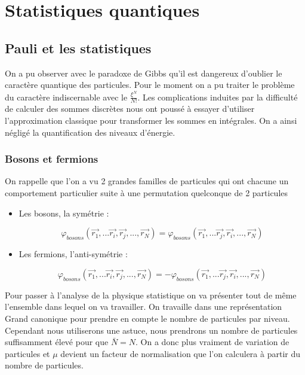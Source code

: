 \chapter{Statistiques quantiques}



\section{Pauli et les statistiques}


On a pu observer avec le paradoxe de Gibbs qu'il est dangereux d'oublier le caractère quantique des particules. Pour le moment on a pu traiter le problème du caractère indiscernable avec le $\frac{\xi^N}{N!}$. Les complications induites par la difficulté de calculer des sommes discrètes nous ont poussé à essayer d'utiliser l'approximation classique pour transformer les sommes en intégrales. On a ainsi négligé la quantification des niveaux d'énergie.

\subsection{Bosons et fermions}

On rappelle que l'on a vu 2 grandes familles de particules qui ont chacune un comportement particulier suite à une permutation quelconque de 2 particules

\begin{itemize}[label=]

	\item Les bosons, la symétrie : 

	$$\varphi_{bosons}(\vec{r_1},...\vec{r_i},\vec{r_j},...,\vec{r_N})=\varphi_{bosons}(\vec{r_1},...\vec{r_j},\vec{r_i},...,\vec{r_N})$$

	\item Les fermions, l'anti-symétrie :

	$$\varphi_{bosons}(\vec{r_1},...\vec{r_i},\vec{r_j},...,\vec{r_N})=-\varphi_{bosons}(\vec{r_1},...\vec{r_j},\vec{r_i},...,\vec{r_N})$$

\end{itemize}

Pour passer à l'analyse de la physique statistique on va présenter tout de même l'ensemble dans lequel on va travailler. On travaille dans une représentation Grand canonique pour prendre en compte le nombre de particules par niveau. Cependant nous utiliserons une astuce, nous prendrons un nombre de particules suffisamment élevé pour que $\bar{N}=N$. On a donc plus vraiment de variation de particules et $\mu$ devient un facteur de normalisation que l'on calculera à partir du nombre de particules.


